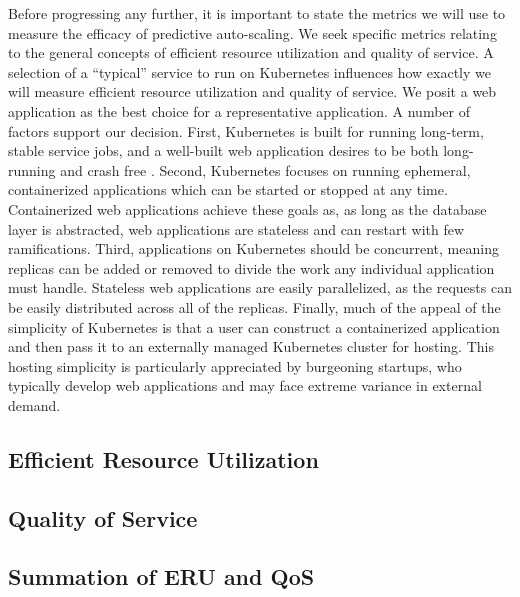 Before progressing any further, it is important to state the metrics we will use
to measure the efficacy of predictive auto-scaling. We seek specific metrics relating to
the general concepts of efficient resource utilization and quality of service.
A selection of a ``typical'' service to run on Kubernetes influences how exactly
we will measure efficient resource utilization and quality of service. We posit
a web application as the best choice for a representative application. A number
of factors support our decision. First, Kubernetes is built for running
long-term, stable service jobs, and a well-built web application desires to be
both long-running and crash free \cite{k8s-design-overview}. Second, Kubernetes
focuses on running ephemeral, containerized applications which can be started or
stopped at any time. Containerized web applications achieve these goals as, as
long as the database layer is abstracted, web applications are stateless and can
restart with few ramifications. Third, applications on Kubernetes should be
concurrent, meaning replicas can be added or removed to divide the work any
individual application must handle. Stateless web applications are easily
parallelized, as the requests can be easily distributed across all of the
replicas. Finally, much of the appeal of the simplicity of Kubernetes is that a
user can construct a containerized application and then pass it to an
externally managed Kubernetes cluster for hosting. This hosting simplicity is
particularly appreciated by burgeoning startups, who typically develop web
applications and may face extreme variance in external demand.

\subsection{Efficient Resource Utilization}



\subsection{Quality of Service}



\subsection{Summation of ERU and QoS}


